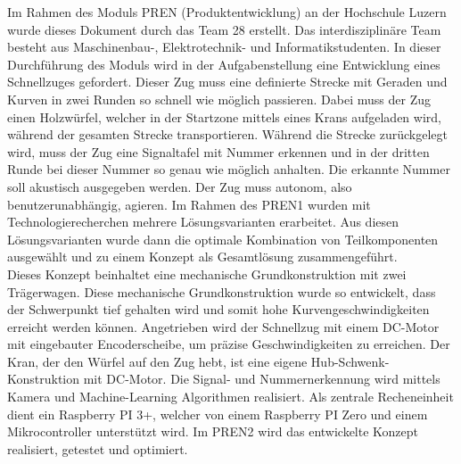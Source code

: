 \documentclass[../../main.tex]{subfiles}
\begin{document}
Im Rahmen des Moduls PREN (Produktentwicklung) an der Hochschule Luzern wurde dieses Dokument durch das Team 28
erstellt. Das interdisziplinäre Team besteht aus Maschinenbau-, Elektrotechnik- und Informatikstudenten. In dieser
Durchführung des Moduls wird in der Aufgabenstellung eine Entwicklung eines Schnellzuges gefordert. Dieser Zug muss eine
definierte Strecke mit Geraden und Kurven in zwei Runden so schnell wie möglich passieren. Dabei muss der Zug einen
Holzwürfel, welcher in der Startzone mittels eines Krans aufgeladen wird, während der gesamten Strecke transportieren.
Während die Strecke zurückgelegt wird, muss der Zug eine Signaltafel mit Nummer erkennen und in der dritten Runde bei
dieser Nummer so genau wie möglich anhalten. Die erkannte Nummer soll akustisch ausgegeben werden. Der Zug muss
autonom, also benutzerunabhängig, agieren. Im Rahmen des PREN1 wurden mit Technologierecherchen mehrere Lösungsvarianten
erarbeitet. Aus diesen Lösungsvarianten wurde dann die optimale Kombination von Teilkomponenten ausgewählt und zu einem
Konzept als Gesamtlösung zusammengeführt.\\
Dieses Konzept beinhaltet eine mechanische Grundkonstruktion mit zwei Trägerwagen. Diese mechanische Grundkonstruktion wurde so entwickelt, dass der Schwerpunkt tief gehalten wird und somit hohe Kurvengeschwindigkeiten erreicht werden können. Angetrieben wird der Schnellzug mit einem DC-Motor mit eingebauter Encoderscheibe, um präzise Geschwindigkeiten zu erreichen. Der Kran, der den Würfel auf den Zug hebt, ist eine eigene Hub-Schwenk-Konstruktion mit DC-Motor. Die Signal- und Nummernerkennung wird mittels Kamera und Machine-Learning Algorithmen realisiert. Als zentrale Recheneinheit dient ein Raspberry PI 3+, welcher von einem Raspberry PI Zero und einem Mikrocontroller unterstützt wird. Im PREN2 wird das entwickelte Konzept realisiert, getestet und optimiert.
\pagebreak
\end{document}
